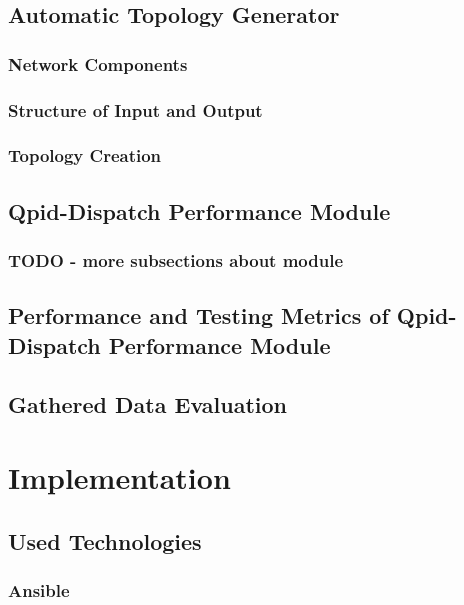 \section{Automatic Topology Generator}

\subsection{Network Components}

\subsection{Structure of Input and Output}

\subsection{Topology Creation}

\section{Qpid-Dispatch Performance Module}

\subsection{TODO - more subsections about module}

\section{Performance and Testing Metrics of Qpid-Dispatch Performance Module}

\section{Gathered Data Evaluation}

\chapter{Implementation}
\label{Implementation}

\section{Used Technologies}

\subsection{Ansible}

